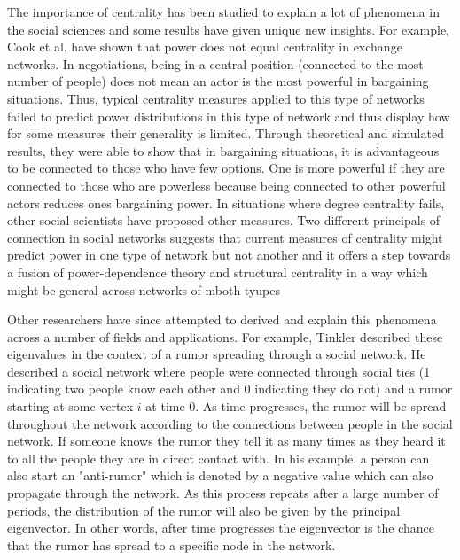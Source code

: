 \documentclass{article}
\theoremstyle{definition}
\theoremstyle{remark}
\begin{document}
The importance of centrality has been studied to explain a lot of phenomena in the social sciences and some results have given unique new insights.  For example, Cook et al. have shown that power does not equal centrality in exchange networks.  In negotiations, being in a central position (connected to the most number of people) does not mean an actor is the most powerful in bargaining situations.\cite{cook1983distribution}  Thus, typical centrality measures applied to this type of networks failed to predict power distributions in this type of network and thus display how for some measures their generality is limited.  Through theoretical and simulated results, they were able to show that in bargaining situations, it is advantageous to be connected to those who have few options.  One is more powerful if they are connected to those who are powerless because being connected to other powerful actors reduces ones bargaining power.  In situations where degree centrality fails, other social scientists have proposed other measures.  Two different principals of connection in social networks suggests that current measures of centrality might predict power in one type of network but not another and it offers a step towards a fusion of power-dependence theory and structural centrality in a way which might be general across networks of mboth tyupes\cite{bonacich1987power}




Other researchers have since attempted to derived and explain this phenomena across a number of fields and applications.  For example, Tinkler described these eigenvalues in the context of a rumor spreading through a social network.  He described a social network where people were connected through social ties (1 indicating two people know each other and 0 indicating they do not) and a rumor starting at some vertex $i$ at time 0.  As time progresses, the rumor will be spread throughout the network according to the connections between people in the social network.  If someone knows the rumor they tell it as many times as they heard it to all the people they are in direct contact with.  In his example, a person can also start an "anti-rumor" which is denoted by a negative value which can also propagate through the network.  As this process repeats after a large number of periods, the distribution of the rumor will also be given by the principal eigenvector.   In other words, after time progresses the eigenvector is the chance that the rumor has spread to a specific node in the network.\cite{tinkler1972physical} \\
\end{document}
